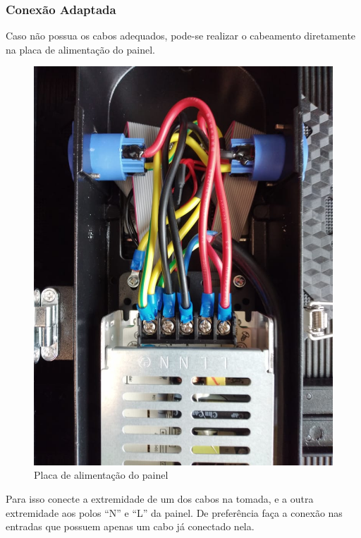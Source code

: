\documentclass[12pt, a4paper]{article}
\begin{document}
\newpage

\subsubsection{Conexão Adaptada}\label{Conexão Adaptada}
Caso não possua os cabos adequados, pode-se realizar o cabeamento diretamente na placa de alimentação do painel.

\begin{figure}[!htb]
	\centering
	\includegraphics[width=.96\textwidth]{painel0.jpeg}
	\caption{\label{fig:painel0.jpeg}Placa de alimentação do painel}
\end{figure}

Para isso conecte a extremidade de um dos cabos na tomada, e a outra extremidade aos polos ``N'' e ``L'' da painel. De preferência faça a conexão nas entradas que possuem apenas um cabo já conectado nela.
\end{document}
